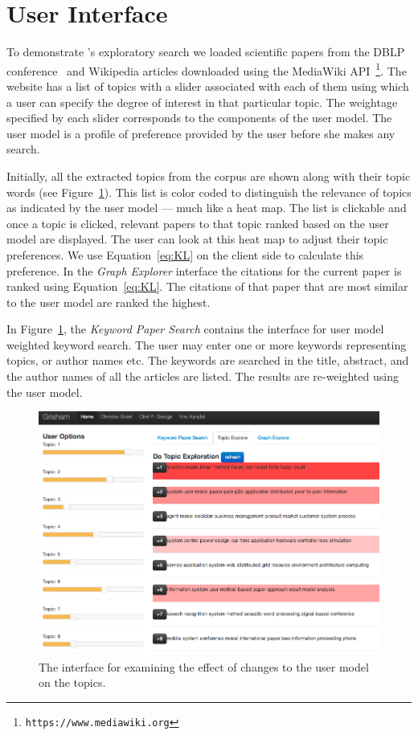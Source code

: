 
\section{User Interface}
\label{sec:demo}


To demonstrate \system's exploratory search we loaded scientific 
papers from the DBLP conference~\cite{Tang:2008:EMA:1367497.1367722} 
and Wikipedia articles downloaded using the MediaWiki API~\footnote{\texttt{https://www.mediawiki.org}}.
The {\system} website has a list of topics with a slider associated 
with each of them using which a user can specify the degree of 
interest in that particular topic. The weightage specified by each 
slider corresponds to the components of the user model. The user 
model is a profile of preference provided by the user before she 
makes any search.

Initially, all the extracted topics from the corpus are shown along 
with their topic words (see Figure~\ref{fig:topic_exploration}).
This list is color coded to distinguish the relevance of topics as indicated by the user model --- much like a heat map.
The list is clickable and once a topic is clicked, relevant papers to that topic ranked based on the user model are displayed.
The user can look at this heat map to adjust their topic preferences.
We use Equation~\ref{eq:KL} on the client side to calculate this preference. 
In the \textsl{Graph Explorer} interface the citations for the current paper is ranked
using Equation~\ref{eq:KL}. The citations of that paper that are most
similar to the user model are ranked the highest.


In Figure~\ref{fig:topic_exploration}, the \textsl{Keyword Paper 
Search} contains the interface for user model weighted keyword search.
The user may enter one or more keywords representing topics, or 
author names etc. The keywords are searched in the title, abstract, 
and the author names of all the articles are listed. The results are  
re-weighted using the user model. 

\begin{figure}[htb]\centering
\includegraphics[width=.45\textwidth]{images/topic_exploration.png} %
\caption{The interface for examining the effect of changes to the user model on the topics.}
\label{fig:topic_exploration}
\end{figure}

